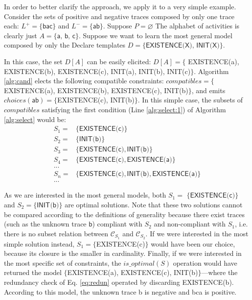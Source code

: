In order to better clarify the approach, we apply it to a very simple example.  
Consider the sets of positive and negative traces composed by only one trace each: $L^+=\{\textsf{bac}\}$ and $L^-=\{\textsf{ab}\}$. Suppose $P=\varnothing$ The alphabet of activities is clearly just $A=\{\textsf{a, b, c}\}$. Suppose we want to learn the most general model composed by only the Declare templates $D=\{\textsf{EXISTENCE(X), INIT(X)}\}$.%

In this case, the set $D[A]$ can be easily elicited: $D[A]=\{$ \textsf{EXISTENCE(a), EXISTENCE(b), EXISTENCE(c), INIT(a), INIT(b), INIT(c)}$\}$. Algorithm \ref{alg:cand} elects the following compatible constraints: ${compatibles}=\{$\textsf{EXISTENCE(a), EXISTENCE(b), EXISTENCE(c), INIT(b)}$\}$, and emits ${choices}(\textsf{ab})=\{$\textsf{EXISTENCE(c), INIT(b)}$\}$.
%
%
In this simple case, the subsets of ${compatibles}$ satisfying the first condition (Line \ref{alg:select:1}) of Algorithm \ref{alg:select} would be: 
\[
\begin{array}{cl}
 S_1= &  \{\textsf{EXISTENCE(c)}\}  \\
 S_2= &  \{\textsf{INIT(b)}\}   \\
 S_3= &  \{\textsf{EXISTENCE(c)}, \textsf{INIT(b)}\} \\
 S_4= & \{\textsf{EXISTENCE(c)}, \textsf{EXISTENCE(a)}\} \\
  ... & \\
 S_n= & \{\textsf{EXISTENCE(c)}, \textsf{INIT(b)}, \textsf{EXISTENCE(a)}\} \\
 ... &
\end{array}
\]

As we are interested in the most general models, both $S_1=$ $\{\textsf{EXISTENCE(c)}\}$ and $S_2=$$\{\textsf{INIT(b)}\}$ are optimal solutions. Note that these two solutions cannot be compared according to the definitions of generality because there exist traces (such as the unknown trace $\textsf{b}$) compliant with $S_2$ and non-compliant with $S_1$, i.e. there is no subset relation between $\mathcal{C}_{S_1}$ and $\mathcal{C}_{S_2}$.
If we were interested in the most simple solution instead, $S_1=\{$\textsf{EXISTENCE(c)}$\}$ would have been our choice, because its closure is the smaller in cardinality.
%
Finally, if we were interested in the most specific set of constraints, the ${is\_optimal}(S)$ operation would have returned the model $\{$\textsf{EXISTENCE(a), EXISTENCE(c), INIT(b)}$\}$---where the redundancy check of Eq. \eqref{eq:redun} operated by discarding \textsf{EXISTENCE(b)}. According to this model, the unknown trace \textsf{b} is negative and \textsf{bca} is positive. 


